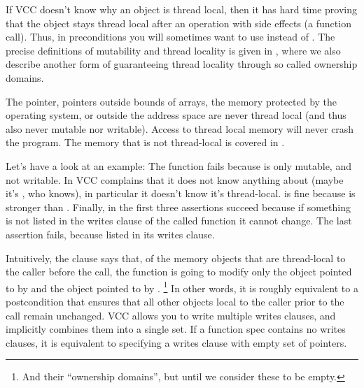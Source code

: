 \begin{note}
If VCC doesn't know why an object is thread local, then it has
hard time proving that the object stays thread local after an operation
with side effects (\eg a function call).
Thus, in preconditions you will sometimes want to use
 instead of .
The precise definitions of mutability and thread locality
is given in ,
where we also describe another form of guaranteeing thread locality
through so called ownership domains.
\end{note}

The  pointer, pointers outside bounds of arrays,
the memory protected by the operating system, or outside
the address space are never thread local (and thus also never mutable
nor writable).
Access to thread local memory will never crash the program.
The memory that is not thread-local is covered in 
.

Let's have a look at an example:
\noindent
The function  fails because  is only
mutable, and not writable.
In  VCC complains that it does not know
anything about  (maybe it's , who knows),
in particular it doesn't know it's thread-local.
 is fine because \vcc{\mutable} is stronger
than .
Finally, in  the first three assertions succeed
because if something is not listed in the writes clause
of the called function it cannot change.
The last assertion fails, because  listed 
in its writes clause.



Intuitively, the clause  says that, 
of the memory objects that are thread-local to the caller before the call,
the function is going to modify only the object pointed to by 
and the object pointed to by .%
\footnote{
And their ``ownership domains'',
but until  we consider these to be empty.
}
In other words, it is roughly equivalent to a postcondition that ensures
that all other objects local to the caller prior
to the call remain unchanged.
VCC allows you
to write multiple writes clauses, and implicitly
combines them into a single set. If a function spec contains no writes clauses, 
it is equivalent to specifying a writes clause with empty set of
pointers.

